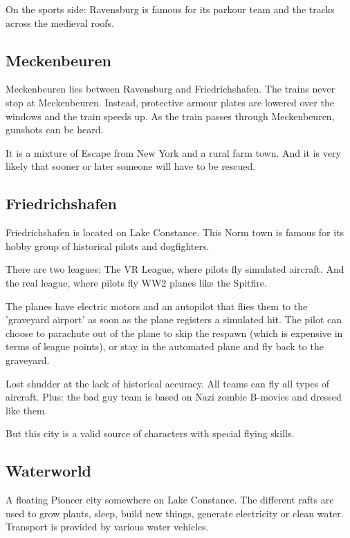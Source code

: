 On the sports side: Ravensburg is famous for its parkour team and the tracks across the medieval roofs.



\subsection{Meckenbeuren}
\label{subsec:Meckenbeuren}

Meckenbeuren lies between Ravensburg and Friedrichshafen. The trains never stop at Meckenbeuren. Instead, protective armour plates are lowered over the windows and the train speeds up. As the train passes through Meckenbeuren, gunshots can be heard.

It is a mixture of Escape from New York and a rural farm town. And it is very likely that sooner or later someone will have to be rescued.

\subsection{Friedrichshafen}
\label{subsec:Friedrichshafen}

Friedrichshafen is located on Lake Constance. This Norm town is famous for its hobby group of historical pilots and dogfighters.

There are two leagues: The VR League, where pilots fly simulated aircraft. And the real league, where pilots fly WW2 planes like the Spitfire.

The planes have electric motors and an autopilot that flies them to the 'graveyard airport' as soon as the plane registers a simulated hit.
The pilot can choose to parachute out of the plane to skip the respawn (which is expensive in terms of league points), or stay in the automated plane and fly back to the graveyard.

Lost shudder at the lack of historical accuracy. All teams can fly all types of aircraft. Plus: the bad guy team is based on Nazi zombie B-movies and dressed like them.

But this city is a valid source of characters with special flying skills.

\subsection{Waterworld}
\label{subsec:Waterworld}

A floating Pioneer city somewhere on Lake Constance. The different rafts are used to grow plants, sleep, build new things, generate electricity or clean water. Transport is provided by various water vehicles.




